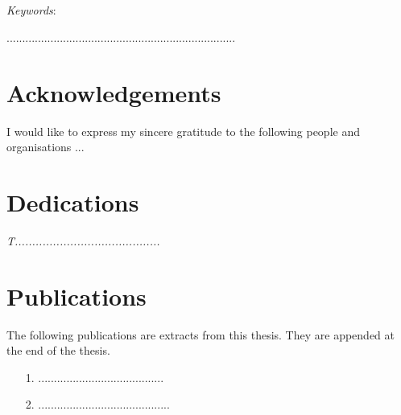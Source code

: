 \begin{abstract}[english]%
ddddddddddddddddddddddddddddddddddddd. 
\end{abstract}
\\\\
\textit{Keywords}: 



.........................................................................



\chapter*{Acknowledgements}%


I would like to express my sincere gratitude to the following people
and organisations ...


\chapter*{Dedications}%
 \vspace{6cm}
 \begin{center}\itshape
T..........................................
 \end{center}
\vfill
 \clearpage
\chapter{Publications}%

The following publications are extracts from this thesis. They are appended at the
end of the thesis.
\begin{itemize}
\item[1.] ........................................
\item[2.] ..........................................
\end{itemize}


\endinput
